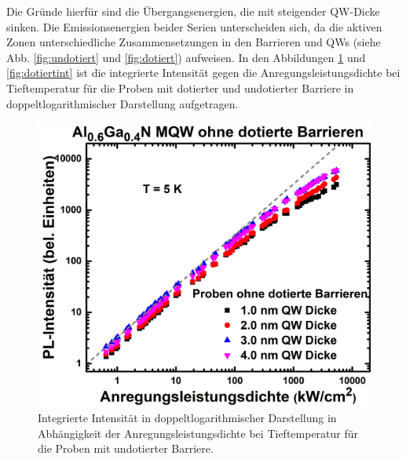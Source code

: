 \noindent 
Die Gründe hierfür sind die Übergangsenergien, die mit steigender QW-Dicke \cite{doi:10.1063/1.371241} sinken. 
Die Emissionsenergien beider Serien unterscheiden sich, da die aktiven Zonen unterschiedliche Zusammensetzungen in den Barrieren und QWs (siehe Abb. \ref{fig:undotiert} und \ref{fig:dotiert}) aufweisen. 
\newline
In den Abbildungen \ref{fig:undotiertint} und \ref{fig:dotiertint} ist die integrierte Intensität gegen die Anregungsleistungsdichte bei Tieftemperatur für die Proben mit dotierter und undotierter Barriere in doppeltlogarithmischer Darstellung aufgetragen.
\begin{figure}[H]
  \centering
  \begin{minipage}[t]{0.49\textwidth}
    \centering
    \includegraphics[width=\textwidth]{Bilder/MQWdickenSerie/intTTundotiert.png}
		\caption{Integrierte Intensität in doppeltlogarithmischer Darstellung in Abhängigkeit der Anregungsleistungsdichte bei Tieftemperatur für die Proben mit undotierter Barriere.}
    \label{fig:undotiertint}
  \end{minipage}
	\hfill
  \begin{minipage}[t]{0.49\textwidth}
    \centering

\end{minipage}
\end{figure}
